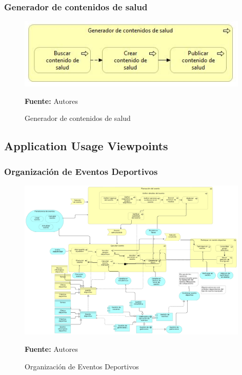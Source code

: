 \subsubsection{Generador de contenidos de salud}

\begin{figure}[!htb]
  \begin{center}
    \includegraphics[width=11cm]{./imagenes/Archimate/vistas/business_process/generadorcontenidossalud.png}
    \caption{Generador de contenidos de salud}
    \label{fig:BP_GeneradorContenidosSalud}
    \textbf{Fuente:}  Autores
  \end{center}
\end{figure}

\subsection{Application Usage Viewpoints}

\subsubsection{Organización de Eventos Deportivos}

\begin{figure}[!htb]
  \begin{center}
    \includegraphics[width=11cm]{./imagenes/Archimate/vistas/application_usage/organizacioneventosdeportivos.png}
    \caption{Organización de Eventos Deportivos}
    \label{fig:au_organizacion_eventos_deportivos}
    \textbf{Fuente:}  Autores
  \end{center}
\end{figure}

